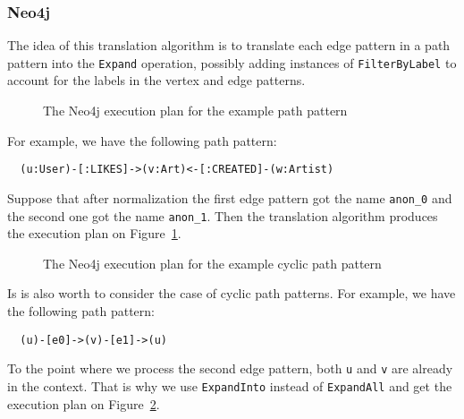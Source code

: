 \documentclass[14pt]{constructor-thesis}
\theoremstyle{definition}
\begin{document}

\subsubsection{Neo4j}

The idea of this translation algorithm is to translate each edge pattern in a path pattern into the \texttt{Expand} operation, possibly adding instances of \texttt{FilterByLabel} to account for the labels in the vertex and edge patterns.

\begin{figure}
  
  \caption{The Neo4j execution plan for the example path pattern}
  \label{fig:neo4j-execution-plan}
\end{figure}

For example, we have the following path pattern:
\begin{verbatim}
  (u:User)-[:LIKES]->(v:Art)<-[:CREATED]-(w:Artist)
\end{verbatim}
Suppose that after normalization the first edge pattern got the name \texttt{anon\_0} and the second one got the name \texttt{anon\_1}. Then the translation algorithm produces the execution plan on Figure~\ref{fig:neo4j-execution-plan}.

\begin{figure}
  
  \caption{The Neo4j execution plan for the example cyclic path pattern}
  \label{fig:neo4j-execution-plan-cyclic}
\end{figure}

Is is also worth to consider the case of cyclic path patterns. For example, we have the following path pattern:
\begin{verbatim}
  (u)-[e0]->(v)-[e1]->(u)
\end{verbatim}
To the point where we process the second edge pattern, both \texttt{u} and \texttt{v} are already in the context. That is why we use \texttt{ExpandInto} instead of \texttt{ExpandAll} and get the execution plan on Figure~\ref{fig:neo4j-execution-plan-cyclic}.
\end{document}

